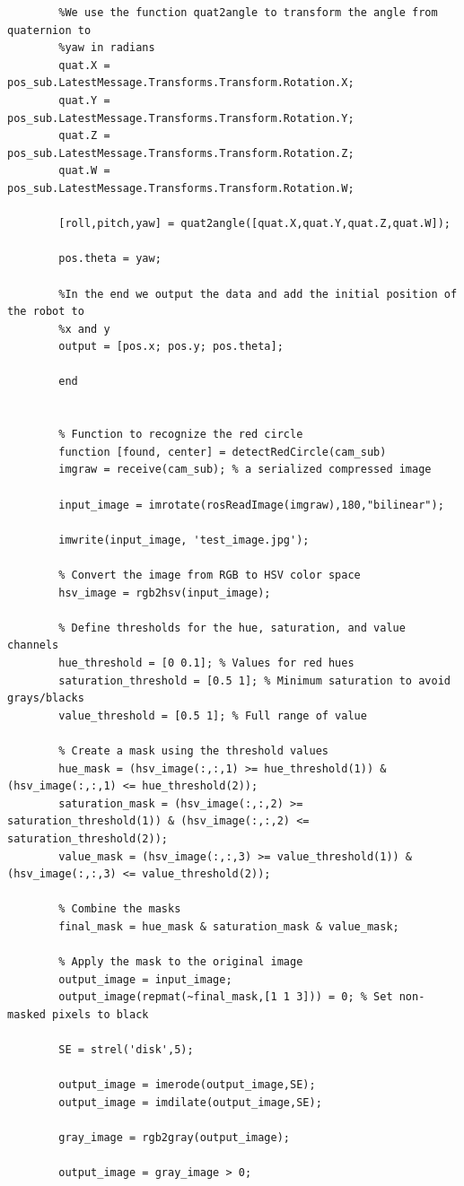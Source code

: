 \documentclass{article}
\begin{document}
\begin{verbatim}
		%We use the function quat2angle to transform the angle from quaternion to
		%yaw in radians
		quat.X = pos_sub.LatestMessage.Transforms.Transform.Rotation.X;
		quat.Y = pos_sub.LatestMessage.Transforms.Transform.Rotation.Y;
		quat.Z = pos_sub.LatestMessage.Transforms.Transform.Rotation.Z;
		quat.W = pos_sub.LatestMessage.Transforms.Transform.Rotation.W;
		
		[roll,pitch,yaw] = quat2angle([quat.X,quat.Y,quat.Z,quat.W]);
		
		pos.theta = yaw;
		
		%In the end we output the data and add the initial position of the robot to
		%x and y
		output = [pos.x; pos.y; pos.theta];
		
		end
		
		
		% Function to recognize the red circle
		function [found, center] = detectRedCircle(cam_sub)
		imgraw = receive(cam_sub); % a serialized compressed image
		
		input_image = imrotate(rosReadImage(imgraw),180,"bilinear");
		
		imwrite(input_image, 'test_image.jpg');
		
		% Convert the image from RGB to HSV color space
		hsv_image = rgb2hsv(input_image);
		
		% Define thresholds for the hue, saturation, and value channels
		hue_threshold = [0 0.1]; % Values for red hues
		saturation_threshold = [0.5 1]; % Minimum saturation to avoid grays/blacks
		value_threshold = [0.5 1]; % Full range of value
		
		% Create a mask using the threshold values
		hue_mask = (hsv_image(:,:,1) >= hue_threshold(1)) & (hsv_image(:,:,1) <= hue_threshold(2));
		saturation_mask = (hsv_image(:,:,2) >= saturation_threshold(1)) & (hsv_image(:,:,2) <= saturation_threshold(2));
		value_mask = (hsv_image(:,:,3) >= value_threshold(1)) & (hsv_image(:,:,3) <= value_threshold(2));
		
		% Combine the masks
		final_mask = hue_mask & saturation_mask & value_mask;
		
		% Apply the mask to the original image
		output_image = input_image;
		output_image(repmat(~final_mask,[1 1 3])) = 0; % Set non-masked pixels to black
		
		SE = strel('disk',5);
		
		output_image = imerode(output_image,SE);
		output_image = imdilate(output_image,SE);
		
		gray_image = rgb2gray(output_image);
		
		output_image = gray_image > 0;
		

\end{verbatim}
\end{document}
